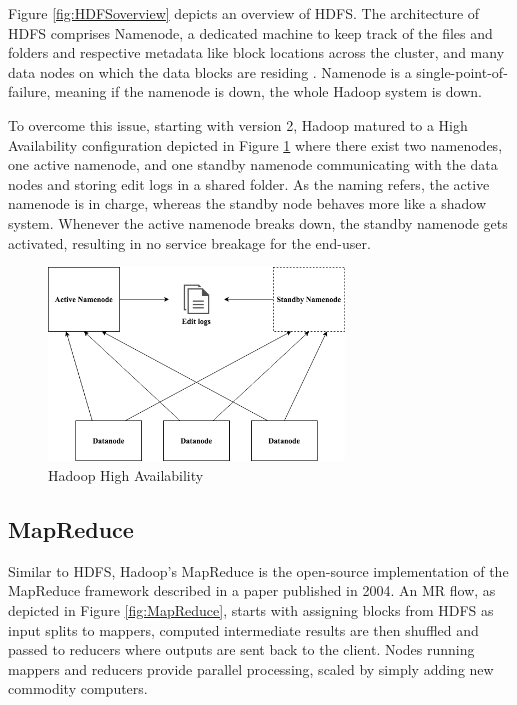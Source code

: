 \documentclass[review]{elsarticle}
\begin{document}
Figure \ref{fig:HDFSoverview} depicts an overview of HDFS. The architecture of HDFS comprises Namenode, a dedicated machine to keep track of the files and folders and respective metadata like block locations across the cluster, and many data nodes on which the data blocks are residing \cite{white_hadoop_2015}. Namenode is a single-point-of-failure, meaning if the namenode is down, the whole Hadoop system is down. 

To overcome this issue, starting with version 2, Hadoop matured to a High Availability configuration depicted in Figure \ref{fig:HadoopHA} where there exist two namenodes, one active namenode, and one standby namenode communicating with the data nodes and storing edit logs in a shared folder. As the naming refers, the active namenode is in charge, whereas the standby node behaves more like a shadow system. Whenever the active namenode breaks down, the standby namenode gets activated, resulting in no service breakage for the end-user.

\begin{figure}[h!]
	\caption{Hadoop High Availability}
	\label{fig:HadoopHA}
	\includegraphics[width=0.7\textwidth]{HadoopHA}
	\centering
\end{figure}

\subsection{MapReduce}\label{MapReduce}
Similar to HDFS, Hadoop's MapReduce is the open-source implementation of the MapReduce framework described in a paper \cite{dean_mapreduce_2004} published in 2004. An MR flow, as depicted in Figure \ref{fig:MapReduce}, starts with assigning blocks from HDFS as input splits to mappers, computed intermediate results are then shuffled and passed to reducers where outputs are sent back to the client. Nodes running mappers and reducers provide parallel processing, scaled by simply adding new commodity computers. 
\end{document}
